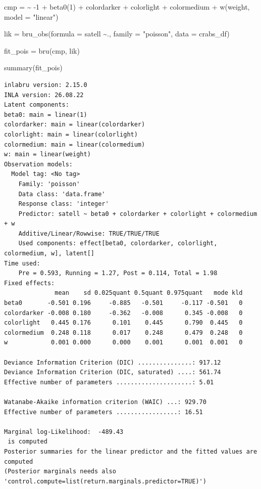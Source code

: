 \documentclass[
  letterpaper,
  DIV=11,
  numbers=noendperiod]{scrartcl}
\newenvironment{Shaded}{\begin{snugshade}}{\end{snugshade}}
\newcommand{\AttributeTok}[1]{\textcolor[rgb]{0.40,0.45,0.13}{#1}}
\newcommand{\DecValTok}[1]{\textcolor[rgb]{0.68,0.00,0.00}{#1}}
\newcommand{\ErrorTok}[1]{\textcolor[rgb]{0.68,0.00,0.00}{#1}}
\newcommand{\FunctionTok}[1]{\textcolor[rgb]{0.28,0.35,0.67}{#1}}
\newcommand{\NormalTok}[1]{\textcolor[rgb]{0.00,0.23,0.31}{#1}}
\newcommand{\OtherTok}[1]{\textcolor[rgb]{0.00,0.23,0.31}{#1}}
\newcommand{\SpecialCharTok}[1]{\textcolor[rgb]{0.37,0.37,0.37}{#1}}
\newcommand{\StringTok}[1]{\textcolor[rgb]{0.13,0.47,0.30}{#1}}
\begin{document}
\begin{Shaded}
\begin{Highlighting}[]
\NormalTok{cmp }\OtherTok{=}  \ErrorTok{\textasciitilde{}} \SpecialCharTok{{-}}\DecValTok{1} \SpecialCharTok{+} \FunctionTok{beta0}\NormalTok{(}\DecValTok{1}\NormalTok{) }\SpecialCharTok{+}\NormalTok{  colordarker }\SpecialCharTok{+}
\NormalTok{       colorlight }\SpecialCharTok{+}\NormalTok{ colormedium }\SpecialCharTok{+}
       \FunctionTok{w}\NormalTok{(weight, }\AttributeTok{model =} \StringTok{"linear"}\NormalTok{)}

\NormalTok{lik }\OtherTok{=}  \FunctionTok{bru\_obs}\NormalTok{(}\AttributeTok{formula =}\NormalTok{ satell }\SpecialCharTok{\textasciitilde{}}\NormalTok{.,}
            \AttributeTok{family =} \StringTok{"poisson"}\NormalTok{,}
            \AttributeTok{data =}\NormalTok{ crabs\_df)}

\NormalTok{fit\_pois }\OtherTok{=} \FunctionTok{bru}\NormalTok{(cmp, lik)}

\FunctionTok{summary}\NormalTok{(fit\_pois)}
\end{Highlighting}
\end{Shaded}

\begin{verbatim}
inlabru version: 2.15.0 
INLA version: 26.08.22 
Latent components:
beta0: main = linear(1)
colordarker: main = linear(colordarker)
colorlight: main = linear(colorlight)
colormedium: main = linear(colormedium)
w: main = linear(weight)
Observation models:
  Model tag: <No tag>
    Family: 'poisson'
    Data class: 'data.frame'
    Response class: 'integer'
    Predictor: satell ~ beta0 + colordarker + colorlight + colormedium + w
    Additive/Linear/Rowwise: TRUE/TRUE/TRUE
    Used components: effect[beta0, colordarker, colorlight, colormedium, w], latent[] 
Time used:
    Pre = 0.593, Running = 1.27, Post = 0.114, Total = 1.98 
Fixed effects:
              mean    sd 0.025quant 0.5quant 0.975quant   mode kld
beta0       -0.501 0.196     -0.885   -0.501     -0.117 -0.501   0
colordarker -0.008 0.180     -0.362   -0.008      0.345 -0.008   0
colorlight   0.445 0.176      0.101    0.445      0.790  0.445   0
colormedium  0.248 0.118      0.017    0.248      0.479  0.248   0
w            0.001 0.000      0.000    0.001      0.001  0.001   0

Deviance Information Criterion (DIC) ...............: 917.12
Deviance Information Criterion (DIC, saturated) ....: 561.74
Effective number of parameters .....................: 5.01

Watanabe-Akaike information criterion (WAIC) ...: 929.70
Effective number of parameters .................: 16.51

Marginal log-Likelihood:  -489.43 
 is computed 
Posterior summaries for the linear predictor and the fitted values are computed
(Posterior marginals needs also 'control.compute=list(return.marginals.predictor=TRUE)')
\end{verbatim}
\end{document}
